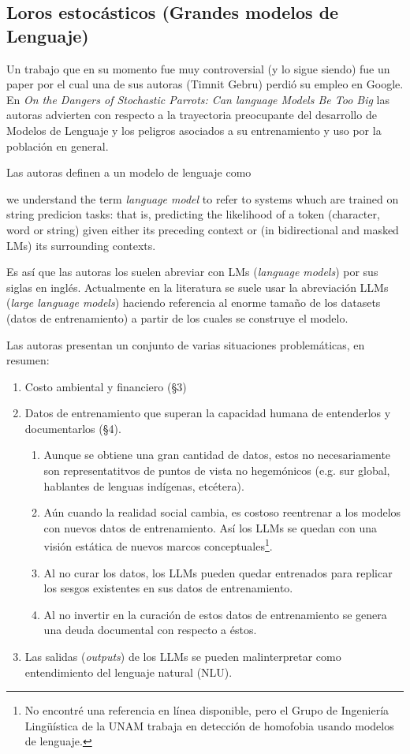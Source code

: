 \documentclass[a4paper,11pt]{article}
\begin{document}
\subsection{Loros estocásticos (Grandes modelos de Lenguaje)}
Un trabajo que en su momento fue muy controversial (y lo sigue siendo) fue un paper por el cual una de sus autoras (Timnit Gebru) perdió su empleo en Google. En \textit{On the Dangers of Stochastic Parrots: Can language Models Be Too Big} \cite{bender_dangers_2021} las autoras advierten con respecto a la trayectoria preocupante del desarrollo de Modelos de Lenguaje y los peligros asociados a su entrenamiento y uso por la población en general.
\par Las autoras definen a un modelo de lenguaje como
\begin{displayquote}
    we understand the term \textit{language model} to refer to systems whuch are trained on string predicion tasks: that is, predicting the likelihood of a token (character, word or string) given either its preceding context or (in bidirectional and masked LMs) its surrounding contexts.
\end{displayquote}
Es así que las autoras los suelen abreviar con LMs (\textit{language models}) por sus siglas en inglés. Actualmente en la literatura se suele usar la abreviación LLMs (\textit{large language models}) haciendo referencia al enorme tamaño de los datasets (datos de entrenamiento) a partir de los cuales se construye el modelo. 
\par Las autoras presentan un conjunto de varias situaciones problemáticas, en resumen:
\begin{enumerate}
    \item Costo ambiental y financiero (\S 3)
    \item Datos de entrenamiento que superan la capacidad humana de entenderlos y documentarlos (\S 4).
    \begin{enumerate}
        \item Aunque se obtiene una gran cantidad de datos, estos no necesariamente son representatitvos de puntos de vista no hegemónicos (e.g. sur global, hablantes de lenguas indígenas, etcétera).
        \item Aún cuando la realidad social cambia, es costoso reentrenar a los modelos con nuevos datos de entrenamiento. Así los LLMs se quedan con una visión estática de nuevos marcos conceptuales\footnote{No encontré una referencia en línea disponible, pero el Grupo de Ingeniería Lingüística de la UNAM trabaja en detección de homofobia usando modelos de lenguaje.}.
        \item Al no curar los datos, los LLMs pueden quedar entrenados para replicar los sesgos existentes en sus datos de entrenamiento.
        \item Al no invertir en la curación de estos datos de entrenamiento se genera una deuda documental con respecto a éstos.
    \end{enumerate}
    \item Las salidas (\textit{outputs}) de los LLMs se pueden malinterpretar como entendimiento del lenguaje natural (NLU).
\end{enumerate}
\end{document}
